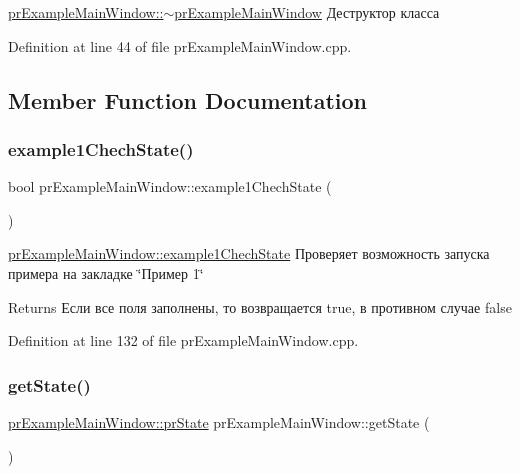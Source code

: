\hyperlink{classpr_example_main_window_a0f04c65433b6de05dba55b26fb9fadba}{pr\+Example\+Main\+Window\+::$\sim$pr\+Example\+Main\+Window} Деструктор класса 



Definition at line 44 of file pr\+Example\+Main\+Window.\+cpp.



\subsection{Member Function Documentation}
\mbox{\label{classpr_example_main_window_a242f1253935a9602cd56d79611790d6f}} 
\subsubsection{\texorpdfstring{example1\+Chech\+State()}{example1ChechState()}}
{\footnotesize\ttfamily bool pr\+Example\+Main\+Window\+::example1\+Chech\+State (\begin{DoxyParamCaption}{ }\end{DoxyParamCaption})\hspace{0.3cm}{\ttfamily [private]}}



\hyperlink{classpr_example_main_window_a242f1253935a9602cd56d79611790d6f}{pr\+Example\+Main\+Window\+::example1\+Chech\+State} Проверяет возможность запуска примера на закладке \char`\"{}Пример 1\char`\"{} 

\begin{DoxyReturn}{Returns}
Если все поля заполнены, то возвращается true, в противном случае false 
\end{DoxyReturn}


Definition at line 132 of file pr\+Example\+Main\+Window.\+cpp.

\mbox{\label{classpr_example_main_window_accee9261c93ec98afa66d5e51642a34e}} 
\subsubsection{\texorpdfstring{get\+State()}{getState()}}
{\footnotesize\ttfamily \hyperlink{classpr_example_main_window_ac6ea07691b05604b1dda8ec6263c028c}{pr\+Example\+Main\+Window\+::pr\+State} pr\+Example\+Main\+Window\+::get\+State (\begin{DoxyParamCaption}{ }\end{DoxyParamCaption})\hspace{0.3cm}{\ttfamily [private]}}



